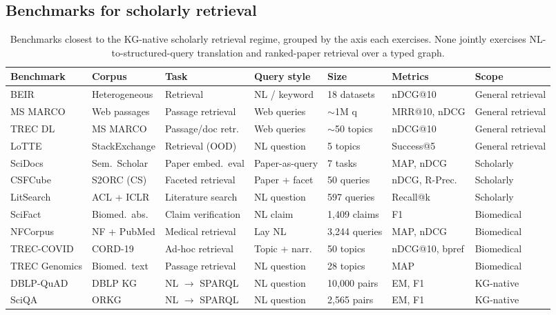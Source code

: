 \subsection{Benchmarks for scholarly retrieval}
\label{sec:lr-bench}

\begin{table}[!t]
\centering\small
\renewcommand{\arraystretch}{1.15}
\begin{tabular}{@{}lllllll@{}}
\toprule
\textbf{Benchmark} & \textbf{Corpus} & \textbf{Task} & \textbf{Query style} & \textbf{Size} & \textbf{Metrics} & \textbf{Scope} \\
\midrule
BEIR            & Heterogeneous   & Retrieval          & NL / keyword   & 18 datasets     & nDCG@10         & General retrieval \\
MS MARCO        & Web passages    & Passage retrieval  & Web queries    & $\sim$1M q       & MRR@10, nDCG    & General retrieval \\
TREC DL         & MS MARCO        & Passage/doc retr.  & Web queries    & $\sim$50 topics  & nDCG@10         & General retrieval \\
LoTTE           & StackExchange   & Retrieval (OOD)    & NL question    & 5 topics         & Success@5       & General retrieval \\
SciDocs         & Sem.\ Scholar   & Paper embed.\ eval & Paper-as-query & 7 tasks          & MAP, nDCG       & Scholarly \\
CSFCube         & S2ORC (CS)      & Faceted retrieval  & Paper + facet  & 50 queries       & nDCG, R-Prec.   & Scholarly \\
LitSearch       & ACL + ICLR      & Literature search  & NL question    & 597 queries      & Recall@k        & Scholarly \\
SciFact         & Biomed.\ abs.   & Claim verification & NL claim       & 1{,}409 claims   & F1              & Biomedical \\
NFCorpus        & NF + PubMed     & Medical retrieval  & Lay NL         & 3{,}244 queries  & MAP, nDCG       & Biomedical \\
TREC-COVID      & CORD-19         & Ad-hoc retrieval   & Topic + narr.  & 50 topics        & nDCG@10, bpref  & Biomedical \\
TREC Genomics   & Biomed.\ text   & Passage retrieval  & NL question    & 28 topics        & MAP             & Biomedical \\
DBLP-QuAD       & DBLP KG         & NL $\to$ SPARQL    & NL question    & 10{,}000 pairs   & EM, F1          & KG-native \\
SciQA           & ORKG            & NL $\to$ SPARQL    & NL question    & 2{,}565 pairs    & EM, F1          & KG-native \\
\bottomrule
\end{tabular}
\caption{Benchmarks closest to the KG-native scholarly retrieval regime, grouped by the axis each exercises. None jointly exercises NL-to-structured-query translation and ranked-paper retrieval over a typed graph.}
\label{tab:benchmarks}
\end{table}

